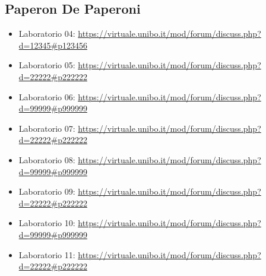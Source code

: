 \subsection{Paperon De Paperoni}

\begin{itemize}
	\item Laboratorio 04: \url{https://virtuale.unibo.it/mod/forum/discuss.php?d=12345#p123456}
	\item Laboratorio 05: \url{https://virtuale.unibo.it/mod/forum/discuss.php?d=22222#p222222}
	\item Laboratorio 06: \url{https://virtuale.unibo.it/mod/forum/discuss.php?d=99999#p999999}
	\item Laboratorio 07: \url{https://virtuale.unibo.it/mod/forum/discuss.php?d=22222#p222222}
	\item Laboratorio 08: \url{https://virtuale.unibo.it/mod/forum/discuss.php?d=99999#p999999}
	\item Laboratorio 09: \url{https://virtuale.unibo.it/mod/forum/discuss.php?d=22222#p222222}
	\item Laboratorio 10: \url{https://virtuale.unibo.it/mod/forum/discuss.php?d=99999#p999999}
	\item Laboratorio 11: \url{https://virtuale.unibo.it/mod/forum/discuss.php?d=22222#p222222}
\end{itemize}



